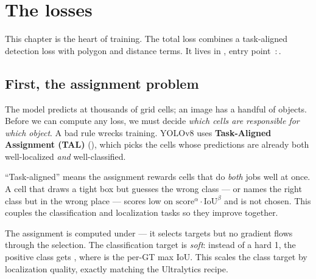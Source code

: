 \chapter{The losses}

This chapter is the heart of training. The total loss combines a task-aligned detection
loss with polygon and distance terms. It lives in , entry point
\,:\,.

\section{First, the assignment problem}
The model predicts at thousands of grid cells; an image has a handful of objects. Before
we can compute any loss, we must decide \emph{which cells are responsible for which
object}. A bad rule wrecks training. YOLOv8 uses \textbf{Task-Aligned Assignment (TAL)}
(), which picks the cells whose predictions are already both
well-localized \emph{and} well-classified.

\begin{center}
\end{center}

\begin{teacher}
``Task-aligned'' means the assignment rewards cells that do \emph{both} jobs well at once.
A cell that draws a tight box but guesses the wrong class --- or names the right class but
in the wrong place --- scores low on $\text{score}^{\alpha}\cdot\text{IoU}^{\beta}$ and is
not chosen. This couples the classification and localization tasks so they improve
together.
\end{teacher}

\begin{hood}
The assignment is computed under  --- it selects targets but no
gradient flows through the selection. The classification target is \emph{soft}: instead of
a hard 1, the positive class gets , where
 is the per-GT max IoU. This scales the class target by localization
quality, exactly matching the Ultralytics recipe.
\end{hood}

